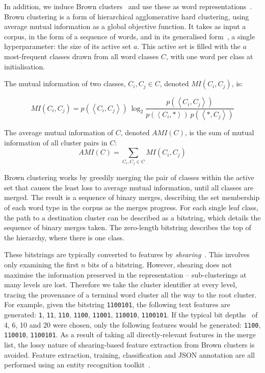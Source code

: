 \documentclass[acmsmall]{acmart}
\begin{document}
In addition, we induce Brown clusters~\cite{brown1992class} and use these as word representations~\cite{turian2009preliminary}.
Brown clustering is a form of hierarchical agglomerative hard clustering, using average mutual information as a global objective function.
It takes as input a corpus, in the form of a sequence of words, and in its generalised form~\cite{derczynski2016generalised}, a single hyperparameter: the size of its active set $a$.
This active set is filled with the $a$ most-frequent classes drawn from all word classes $C$, with one word per class at initialisation.

The mutual information of two classes, $C_i,C_j\in C$, denoted $MI(C_i,C_j)$, is:

\begin{equation}
MI(C_i,C_j)=
p(\left<C_i,C_j\right>)\ \log_2{\frac{p(\left<C_i,C_j\right>)}{p(\left<C_i,*\right>)\ p(\left<*,C_j\right>)}}
\end{equation}

The average mutual information of $C$, denoted $AMI(C)$, is the sum of mutual information of all cluster pairs in $C$:
\begin{equation}
AMI(C) = \sum_{C_i,C_j\in C}{MI(C_i,C_j)}
\end{equation}

Brown clustering works by greedily merging the pair of classes within the active set that causes the least loss to average mutual information, until all classes are merged.
The result is a sequence of binary merges, describing the set membership of each word type in the corpus as the merges progress.
For each single leaf class, the path to a destination cluster can be described as a bitstring, which details the sequence of binary merges taken.
The zero-length bitstring describes the top of the hierarchy, where there is one class.

These bitstrings are typically converted to features by \emph{shearing}~\cite{derczynski2016generalised}.
This involves only examining the first $n$ bits of a bitstring.
However, shearing does not maximise the information preserved in the representation -- sub-clusterings at many levels are lost.
Therefore we take the cluster identifier at every level, tracing the provenance of a terminal word cluster all the way to the root cluster.
For example, given the bitstring {\tt 1100101}, the following text features are generated: {\tt 1}, {\tt 11}, {\tt 110}, {\tt 1100}, {\tt 11001}, {\tt 110010}, {\tt 1100101}.
If the typical bit depths~\cite{ratinov2009design} of 4, 6, 10 and 20 were chosen, only the following features would be generated: {\tt 1100}, {\tt 110010}, {\tt 1100101}.
As a result of taking all directly-relevant features in the merge list, the lossy nature of shearing-based feature extraction from Brown clusters is avoided.
Feature extraction, training, classification and JSON annotation are all performed using an entity recognition toolkit~\cite{derczynski2015usfd}.%
\end{document}
